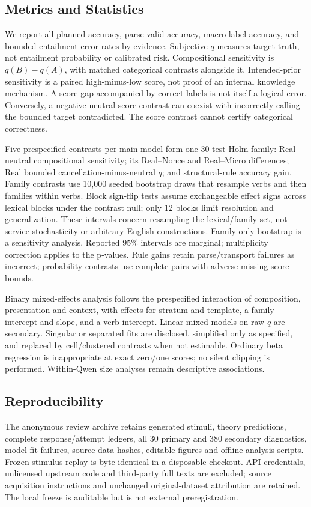 \documentclass[sigconf,anonymous,review]{acmart}
\begin{document}
\subsection{Metrics and Statistics}
We report all-planned accuracy, parse-valid accuracy, macro-label accuracy, and bounded entailment error rates by evidence. Subjective $q$ measures target truth, not entailment probability or calibrated risk. Compositional sensitivity is $q(B)-q(A)$, with matched categorical contrasts alongside it. Intended-prior sensitivity is a paired high-minus-low score, not proof of an internal knowledge mechanism. A score gap accompanied by correct labels is not itself a logical error. Conversely, a negative neutral score contrast can coexist with incorrectly calling the bounded target contradicted. The score contrast cannot certify categorical correctness.

Five prespecified contrasts per main model form one 30-test Holm family: Real neutral compositional sensitivity; its Real--Nonce and Real--Micro differences; Real bounded cancellation-minus-neutral $q$; and structural-rule accuracy gain. Family contrasts use 10,000 seeded bootstrap draws that resample verbs and then families within verbs. Block sign-flip tests assume exchangeable effect signs across lexical blocks under the contrast null; only 12 blocks limit resolution and generalization. These intervals concern resampling the lexical/family set, not service stochasticity or arbitrary English constructions. Family-only bootstrap is a sensitivity analysis. Reported 95\% intervals are marginal; multiplicity correction applies to the p-values. Rule gains retain parse/transport failures as incorrect; probability contrasts use complete pairs with adverse missing-score bounds.

Binary mixed-effects analysis follows the prespecified interaction of composition, presentation and context, with effects for stratum and template, a family intercept and slope, and a verb intercept. Linear mixed models on raw $q$ are secondary. Singular or separated fits are disclosed, simplified only as specified, and replaced by cell/clustered contrasts when not estimable. Ordinary beta regression is inappropriate at exact zero/one scores; no silent clipping is performed. Within-Qwen size analyses remain descriptive associations. 

\subsection{Reproducibility}
The anonymous review archive retains generated stimuli, theory predictions, complete response/attempt ledgers, all 30 primary and 380 secondary diagnostics, model-fit failures, source-data hashes, editable figures and offline analysis scripts. Frozen stimulus replay is byte-identical in a disposable checkout. API credentials, unlicensed upstream code and third-party full texts are excluded; source acquisition instructions and unchanged original-dataset attribution are retained. The local freeze is auditable but is not external preregistration.
\end{document}
